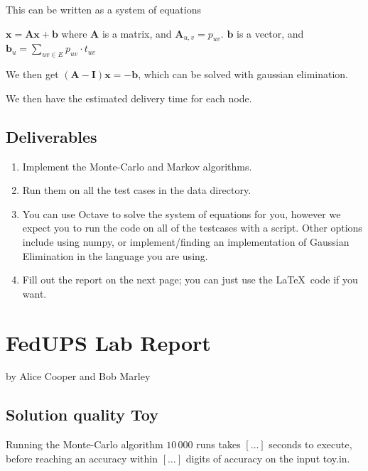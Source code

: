 \documentclass{tufte-handout}
\begin{document}
This can be written as a system of equations

$\bm{x} = \bm{Ax} + \bm{b}$
where $\bm{A}$ is a matrix, and $\bm{A}_{u,v} = p_{uv}$. $\bm{b}$ is a vector, and $\bm{b}_u = \sum_{uv \in E}{p_{uv}\cdot t_{uv}}$

We then get $(\bm{A}-\bm{I})\bm{x} = -\bm{b}$, which can be solved with gaussian elimination.

We then have the estimated delivery time for each node.

\subsection{Deliverables}

\begin{enumerate}
\item Implement the Monte-Carlo and Markov algorithms.
\item Run them on all the test cases in the data directory.
\item You can use Octave to solve the system of equations for you, 
    however we expect you to run the code on all of the testcases with a script.
    Other options include using numpy, or implement/finding an implementation of
        Gaussian Elimination in the language you are using.
\item Fill out the report on the next page; you can just use the
  \LaTeX\ code if you want.
\end{enumerate}

\newpage


\newpage
\section{FedUPS Lab Report}


by Alice Cooper and Bob Marley


\subsection{Solution quality Toy}

Running the Monte-Carlo algorithm $10\,000$ runs takes $[\ldots]$ seconds to execute, before reaching an accuracy within $[\ldots]$ digits
of accuracy on the input toy.in.
\end{document}
